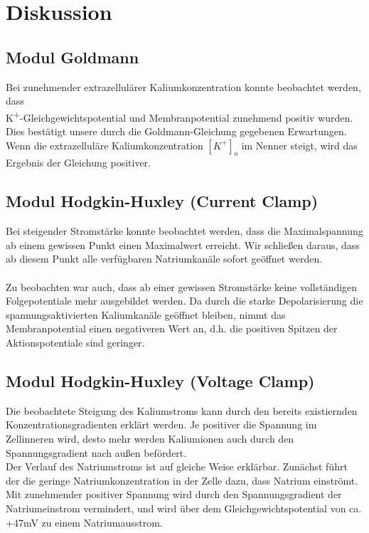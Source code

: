 \documentclass[a4paper]{article}
\begin{document}
\newpage
\section{Diskussion}
\vspace{1.0\baselineskip}
\subsection{Modul Goldmann}
Bei zunehmender extrazellulärer Kaliumkonzentration konnte beobachtet werden, dass \\  K\textsuperscript{+}-Gleichgewichtspotential und Membranpotential zunehmend positiv wurden.
Dies bestätigt unsere durch die Goldmann-Gleichung gegebenen Erwartungen. Wenn die extrazelluläre Kaliumkonzentration \([K^+]_o\) im Nenner steigt, wird das Ergebnis der Gleichung positiver.

\subsection{Modul Hodgkin-Huxley (Current Clamp)}
Bei steigender Stromstärke konnte beobachtet werden, dass die Maximalspannung ab einem gewissen Punkt einen Maximalwert erreicht. Wir schließen daraus, dass ab diesem Punkt alle verfügbaren Natriumkanäle sofort geöffnet werden.\\ \\
Zu beobachten war auch, dass ab einer gewissen Stromstärke keine vollständigen Folgepotentiale mehr ausgebildet werden. Da durch die starke Depolarisierung die spannungsaktivierten Kaliumkanäle geöffnet bleiben, nimmt das Membranpotential einen negativeren Wert an, d.h. die positiven Spitzen der Aktionspotentiale sind geringer.

\subsection{Modul Hodgkin-Huxley (Voltage Clamp)}
Die beobachtete Steigung des Kaliumstroms kann durch den bereits existiernden Konzentrationsgradienten erklärt werden. Je positiver die Spannung im Zellinneren wird, desto mehr werden Kaliumionen auch durch den Spannungsgradient nach außen befördert.\\
Der Verlauf des Natriumstroms ist auf gleiche Weise erklärbar. Zunächst führt der die geringe Natriumkonzentration in der Zelle dazu, dass Natrium einströmt. Mit zunehmender positiver Spannung wird durch den Spannungsgradient der Natriumeinstrom vermindert, und wird über dem Gleichgewichtspotential von ca. +47mV zu einem Natriumausstrom.
\end{document}
